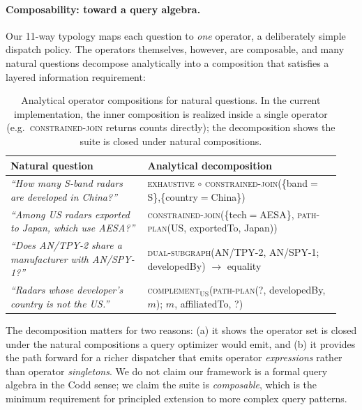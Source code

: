 \documentclass[11pt,a4paper]{article}
\newcommand{\op}[1]{\textsc{\small #1}}
\begin{document}
\paragraph{Composability: toward a query algebra.}
Our 11-way typology maps each question to \emph{one} operator, a deliberately simple dispatch policy. The operators themselves, however, are composable, and many natural questions decompose analytically into a composition that satisfies a layered information requirement:

\begin{table}[h]
\centering
\small
\caption{Analytical operator compositions for natural questions. In the current implementation, the inner composition is realized inside a single operator (e.g.\ \op{constrained-join} returns counts directly); the decomposition shows the suite is closed under natural compositions.}
\label{tab:composability}
\begin{tabular}{p{0.39\linewidth} p{0.55\linewidth}}
\toprule
\textbf{Natural question} & \textbf{Analytical decomposition} \\
\midrule
\emph{``How many S-band radars are developed in China?''} & \op{exhaustive} $\circ$ \op{constrained-join}(\{band$\!=\!$S\},\{country$\!=\!$China\}) \\
\emph{``Among US radars exported to Japan, which use AESA?''} & \op{constrained-join}(\{tech$\!=\!$AESA\}, \op{path-plan}(US, exportedTo, Japan)) \\
\emph{``Does AN/TPY-2 share a manufacturer with AN/SPY-1?''} & \op{dual-subgraph}(AN/TPY-2, AN/SPY-1; developedBy) $\to$ equality \\
\emph{``Radars whose developer's country is not the US.''} & \op{complement}$_{\text{US}}$(\op{path-plan}(?, developedBy, $m$); $m$, affiliatedTo, ?) \\
\bottomrule
\end{tabular}
\end{table}

The decomposition matters for two reasons: (a) it shows the operator set is closed under the natural compositions a query optimizer would emit, and (b) it provides the path forward for a richer dispatcher that emits operator \emph{expressions} rather than operator \emph{singletons}. We do not claim our framework is a formal query algebra in the Codd \citep{codd1970relational} sense; we claim the suite is \emph{composable}, which is the minimum requirement for principled extension to more complex query patterns.
\end{document}
